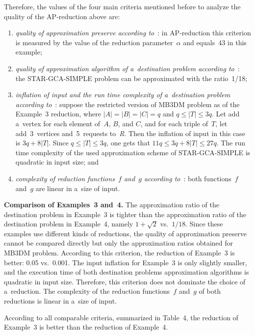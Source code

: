 \begin{multicols}{2}
Therefore, the values of the four main criteria mentioned
before to analyze the quality of the AP-reduction above are:
\begin{enumerate}[(1)]
\item {\it quality of approximation preserve according
to}~\cite{AEMSSW2005}: in AP-reduction this criterion is measured by
the value of the reduction parameter~$\alpha$ and
equals~43 in this example;
\item {\it quality of approximation algorithm of a~destination
problem according to}~\cite{AEMSSW2005}: the {STAR-GCA-SIMPLE}
problem can be approximated with the ratio~1/18;
\item {\it inflation of input and the run time complexity of
a~destination problem according to}~\cite{AEMSSW2005}: suppose the
restricted version of {MB3DM} problem as of the Example~3
reduction, where $|A|=|B|=|C|=q$ and $q\leq|T|\leq 3q$. Let add a~vertex for each element of~$A$, $B$, and $C$, and for each triple of~$T$,
let add~3~vertices and~5~requests to~\textit{R}. Then the
inflation of input in this case is $3q+8|T|$. Since $q \leq |T| \leq
3q$, one gets that $11q \leq 3q+8|T| \leq 27q$. The run time complexity
of the used approximation scheme of {STAR-GCA-SIMPLE} is
quadratic in
input size; and
\item {\it complexity of reduction functions~$f$ and~$g$
according to}~\cite{AEMSSW2005}: both functions~$f$ and~$g$ are
linear in a~size of input.
\end{enumerate}

\smallskip

\noindent
\textbf{Comparison of Examples~3 and~4.} The approximation
ratio of the destination problem in Example~3 is tighter than the
approximation ratio of the destination problem in Example~4, namely
$1+\sqrt{2}$ vs.\ $1/18$. Since these examples use different kinds
of reductions,  the quality of approximation
preserve cannot be compared directly but only the approximation ratios obtained for
{MB3DM} problem. According to this criterion, the reduction of
Example~3 is better: 0.05 vs.~0.001. The input inflation for
Example~3 is only slightly smaller, and the execution time of both
destination problems approximation algorithms is quadratic in input
size. Therefore, this criterion does not dominate the choice of a~reduction. The complexity of the reduction functions~$f$ and~$g$ of
both reductions is linear in a~size of input.

According to all comparable criteria, summarized in Table~4,
the reduction of Example~3 is better than the reduction of Example~4.


\end{multicols}
